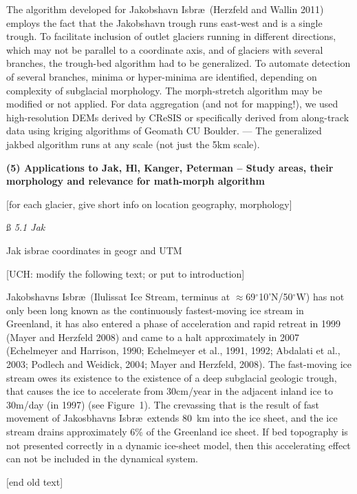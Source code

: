 \documentclass[11pt]{article}
\begin{document}
  The algorithm developed for Jakobshavn Isbr\ae\ (Herzfeld and Wallin 2011) employs the fact that the Jakobshavn trough runs east-west and is a single trough.  To facilitate inclusion of outlet glaciers running in 
  different directions, which may not be parallel to a coordinate axis, and of glaciers with several branches,
  the trough-bed algorithm had to be generalized. To automate detection of several branches, minima or hyper-minima are identified, depending on complexity of subglacial morphology. The morph-stretch algorithm may be modified or not applied. For data aggregation (and not for mapping!), we used high-resolution DEMs derived by CReSIS  or specifically derived from along-track data using kriging algorithms of Geomath CU Boulder.
 --- The generalized jakbed algorithm runs at any scale (not just the 5km scale).
 
 
 \bs
 {\bf (5) Applications to Jak, Hl, Kanger, Peterman -- Study areas, their morphology and relevance for math-morph algorithm}
 
 [for each glacier, give short info on location geography, morphology]
 
  \ss
 {\it 5.1 Jak}
 
Jak isbrae coordinates in geogr and UTM
 
 
 [UCH: modify the following text; or put to introduction]
 
 Jakobshavns Isbr\ae\ (Ilulissat Ice Stream, terminus at $\approx$69$^\circ$10'N/50$^\circ$W)  has not only been long known as the continuously fastest-moving ice stream in Greenland,
it has also entered a phase of acceleration and rapid retreat in 1999 (Mayer and Herzfeld 2008) and came to a halt approximately in 2007 (Echelmeyer and Harrison, 1990; Echelmeyer et al., 1991, 1992; Abdalati et al., 2003;  Podlech and Weidick, 2004; Mayer and Herzfeld, 2008). The fast-moving ice stream owes its existence to the existence of a deep subglacial geologic trough, that causes the ice to
accelerate from 30cm/year in the adjacent inland ice to 30m/day (in 1997) (see Figure~1).
The crevassing that is the result of fast movement of Jakosbhavns Isbr\ae\ extends 80~km into the ice sheet, and the ice stream drains approximately 6\% of the Greenland ice sheet.
If bed topography is not presented correctly in a dynamic ice-sheet model, then this accelerating effect can not be included in the dynamical system.
 
 [end old text]
\end{document}
